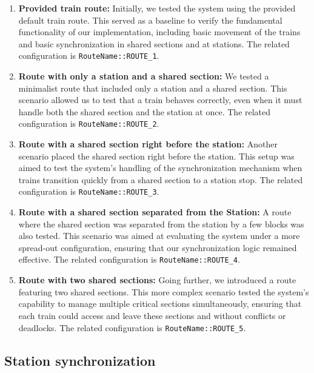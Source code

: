 \documentclass{article}
\begin{document}
    \begin{enumerate}
        \item \textbf{Provided train route:} Initially, we tested the system using the provided default train route. This served as a baseline to verify the fundamental functionality of our implementation, including basic movement of the trains and basic synchronization in shared sections and at stations. The related configuration is \texttt{RouteName::ROUTE\_1}.

        \item \textbf{Route with only a station and a shared section:} We tested a minimalist route that included only a station and a shared section. This scenario allowed us to test that a train behaves correctly, even when it must handle both the shared section and the station at once. The related configuration is \texttt{RouteName::ROUTE\_2}.

        \item \textbf{Route with a shared section right before the station:} Another scenario placed the shared section right before the station. This setup was aimed to test the system's handling of the synchronization mechanism when trains transition quickly from a shared section to a station stop. The related configuration is \texttt{RouteName::ROUTE\_3}.

        \item \textbf{Route with a shared section separated from the Station:} A route where the shared section was separated from the station by a few blocks was also tested. This scenario was aimed at evaluating the system under a more spread-out configuration, ensuring that our synchronization logic remained effective. The related configuration is \texttt{RouteName::ROUTE\_4}.

        \item \textbf{Route with two shared sections:} Going further, we introduced a route featuring two shared sections. This more complex scenario tested the system's capability to manage multiple critical sections simultaneously, ensuring that each train could access and leave these sections and without conflicts or deadlocks. The related configuration is \texttt{RouteName::ROUTE\_5}.

    \end{enumerate}

    \subsection{Station synchronization}
\end{document}
